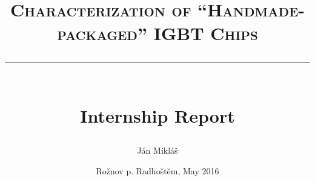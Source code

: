 \documentclass[]{article}
\begin{document}
\author{Ján Mikláš}
\date{Rožnov p. Radhoštěm, May 2016}
\title{\vspace{1cm} \textsc{Characterization of ``Handmade-packaged'' IGBT Chips}\\\rule{.5\textwidth}{1pt}\\Internship Report}


\maketitle

\newpage
\tableofcontents

\newpage


\newpage


\newpage


\newpage


\newpage

\FloatBarrier

\newpage
%


\newpage
\appendix
\newpage

%


\section*{}

\end{document}
